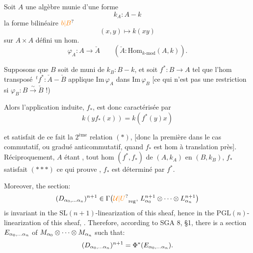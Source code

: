 
Soit $A$ une algèbre munie d'une forme
\[
k_A:A-k
\]
  la forme bilinéaire $\unsure{b|B}$
\[
(x,y)\longmapsto k(xy)
\]
sur $A\times A$  défini un  hom. 
\[
\varphi_A:A\longrightarrow\check A\qquad(\check A:\mathrm{Hom}_{k\text{-}\mathrm{mod}}(A,k)).
\]

Supposons que $B$ soit de  muni de $k_B:B-k$,  et soit $f^*:B\longrightarrow A$ tel que l'hom transposé $\,{}^{t}f^*:\check A-\check B$ applique $\mathrm{Im}\,\varphi_A$ dans $\mathrm{Im}\,\varphi_B$ [ce qui n'est pas une restriction si $\varphi_B:B\xrightarrow{\sim}\check B$ !)

Alors l'application induite,  $f_*$, est donc caractérisée par
\[
k(y f_*(x))=k(f^*(y)x) \tag*{$(\ast\ast\ast)$}
\]

et satisfait de ce fait la $2^{\text{ème}}$ relation $(\ast)$, [donc la première dans le cas commutatif, ou gradué anticommutatif, quand $f_*$ est hom à translation  près].
Réciproquement, $A$ étant ,  tout hom $(f^*,f_*)$ de $(A,k_A)$ en $(B,k_B)$, $f_*$ satisfait $(\ast\ast\ast)$ ce qui prouve , $f_*$ est déterminé par $f^*$.


Moreover, the section:
\[
(D_{\handwritten{\alpha_0},\ldots\handwritten{\alpha_n}})^{n+1}\in\Gamma\handwritten{\bigl(}\handwritten{\unsure{\mathcal U|U}}_{\mathrm{reg}},\,L_{\handwritten{\alpha_0}}^{n+1}\handwritten{\otimes}\cdots\handwritten{\otimes}L_{\handwritten{\alpha_n}}^{n+1}\handwritten{\bigr)}
\]
is invariant in the $\mathrm{SL}(n+1)$-linearization of this sheaf, hence in the $\mathrm{PGL}(n)$-linearization of this sheaf, . Therefore, according to SGA 8, \S1, there is a section $E_{\alpha_0,\ldots\alpha_n}$ of $M_{\alpha_0}\otimes\cdots\otimes M_{\alpha_n}$ such that:
\[
(D_{\alpha_0,\ldots\alpha_n})^{n+1}=\Phi^*(E_{\alpha_0,\ldots\alpha_n}).
\]

